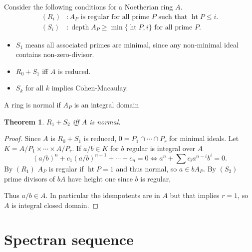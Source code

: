 \documentclass[leqno]{amsart}
\DeclareMathOperator{\hht}{ht}
\DeclareMathOperator{\depth}{depth}
\newcommand{\1}{\mathbf{1}}
\newtheorem{thm}{Theorem}[section]
\theoremstyle{definition}
\theoremstyle{remark}
\begin{document}
Consider the following conditions for a Noetherian ring $A$.
\begin{align*}
	(R_i)&\colon 
	A_P\text{ is regular for all prime $P$ such that }
	\hht P\leq i.\\
	(S_i)&\colon 
	\depth A_P\geq \min\{\hht P, i\} \text{ for all prime }P.
\end{align*}
\begin{itemize}
	\item $S_1$ means all associated primes are minimal,
		since any non-minimal ideal 
		contains non-zero-divisor.
	\item  $R_0+S_1$ iff  $A$ is reduced.
	\item  $S_k$ for all  $k$ implies Cohen-Macaulay.
\end{itemize}

A ring is normal if $A_P$ is an integral domain 
\begin{thm}
	$R_1+S_2$ iff  $A$ is normal.
\end{thm}
\begin{proof}
	Since $A$ is  $R_0+S_1$ is reduced,
	 $0=P_1\cap \cdots\cap P_r$ for minimal ideals.
	 Let $K=A/P_1\times\cdots\times A/P_r$.
	 If $a/b\in K$ for  $b$ regular is integral over  $A$
	  \[
		  (a/b)^n+c_1(a/b)^{n-1}+\cdots+c_n=0
		  \Longleftrightarrow
		  a^n+\sum c_ia^{n-i}b^i=0.
	 \]
	 By $(R_1)$ $A_P$ is regular if  $\hht P=1$ and thus normal,
	 so  $a\in bA_P$.
	 By  $(S_2)$ prime divisors of  $bA$ have height one
	 since  $b$ is regular,
	 
	 Thus  $a/b\in A$.
	 In particular the idempotents are in $A$
	 but that implies $r=1$, so $A$ is integral closed domain.
\end{proof}

\section{Spectran sequence}
\end{document}
